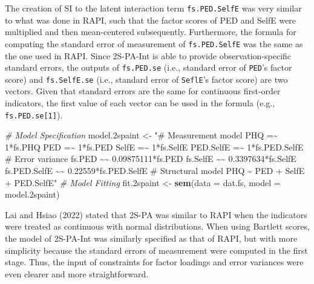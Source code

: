 \documentclass[
  man]{apa7}
\newenvironment{Shaded}{\begin{snugshade}}{\end{snugshade}}
\newcommand{\AttributeTok}[1]{\textcolor[rgb]{0.13,0.29,0.53}{#1}}
\newcommand{\CommentTok}[1]{\textcolor[rgb]{0.56,0.35,0.01}{\textit{#1}}}
\newcommand{\FloatTok}[1]{\textcolor[rgb]{0.00,0.00,0.81}{#1}}
\newcommand{\FunctionTok}[1]{\textcolor[rgb]{0.13,0.29,0.53}{\textbf{#1}}}
\newcommand{\NormalTok}[1]{#1}
\newcommand{\OtherTok}[1]{\textcolor[rgb]{0.56,0.35,0.01}{#1}}
\newcommand{\StringTok}[1]{\textcolor[rgb]{0.31,0.60,0.02}{#1}}
\begin{document}
The creation of SI to the latent interaction term \texttt{fs.PED.SelfE} was very similar to what was done in RAPI, such that the factor scores of PED and SelfE were multiplied and then mean-centered subsequently. Furthermore, the formula for computing the standard error of measurement of \texttt{fs.PED.SelfE} was the same as the one used in RAPI. Since 2S-PA-Int is able to provide observation-specific standard errors, the outputs of \texttt{fs.PED.se} (i.e., standard error of \texttt{PED}'s factor score) and \texttt{fs.SelfE.se} (i.e., standard error of \texttt{SeflE}'s factor score) are two vectors. Given that standard errors are the same for continuous first-order indicators, the first value of each vector can be used in the formula (e.g., \texttt{fs.PED.se{[}1{]}}).

\begin{Shaded}
\begin{Highlighting}[]
\CommentTok{\# Model Specification}
\NormalTok{model}\FloatTok{.2}\NormalTok{spaint }\OtherTok{\textless{}{-}} \StringTok{"\# Measurement model}
\StringTok{                    PHQ =\textasciitilde{} 1*fs.PHQ}
\StringTok{                    PED =\textasciitilde{} 1*fs.PED}
\StringTok{                    SelfE =\textasciitilde{} 1*fs.SelfE}
\StringTok{                    PED.SelfE =\textasciitilde{} 1*fs.PED.SelfE}
\StringTok{                  \# Error variance}
\StringTok{                    fs.PED \textasciitilde{}\textasciitilde{} 0.09875111*fs.PED}
\StringTok{                    fs.SelfE \textasciitilde{}\textasciitilde{} 0.3397634*fs.SelfE}
\StringTok{                    fs.PED.SelfE \textasciitilde{}\textasciitilde{} 0.22559*fs.PED.SelfE}
\StringTok{                  \# Structural model}
\StringTok{                    PHQ \textasciitilde{} PED + SelfE + PED.SelfE"}
\CommentTok{\# Model Fitting}
\NormalTok{fit}\FloatTok{.2}\NormalTok{spaint }\OtherTok{\textless{}{-}} \FunctionTok{sem}\NormalTok{(}\AttributeTok{data =}\NormalTok{ dat.fs, }\AttributeTok{model =}\NormalTok{ model}\FloatTok{.2}\NormalTok{spaint)}
\end{Highlighting}
\end{Shaded}

Lai and Hsiao (2022) stated that 2S-PA was similar to RAPI when the indicators were treated as continuous with normal distributions. When using Bartlett scores, the model of 2S-PA-Int was similarly specified as that of RAPI, but with more simplicity because the standard errors of measurement were computed in the first stage. Thus, the input of constraints for factor loadings and error variances were even clearer and more straightforward.
\end{document}

